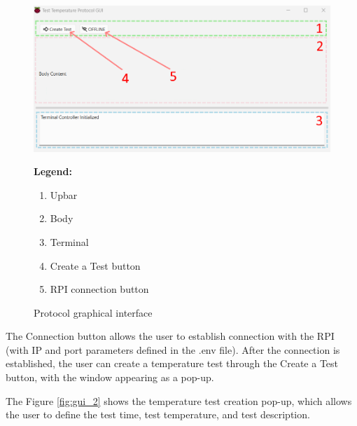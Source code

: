 \begin{figure}[H]
    \centering
    \begin{minipage}{0.6\textwidth}
        \includegraphics[width=\linewidth]{figures/gui_1.png}
    \end{minipage}%
    \hfill
    \begin{minipage}{0.35\textwidth}
        \small
        \textbf{Legend:}
        \begin{enumerate}
            \item Upbar
            \item Body
            \item Terminal
            \item Create a Test button
            \item RPI connection button
        \end{enumerate}
    \end{minipage}
    \caption{Protocol graphical interface}
    \label{fig:gui_1}
\end{figure}

The Connection button allows the user to establish connection with the RPI (with IP and port parameters defined in the .env file). After the connection is established, the user can create a temperature test through the Create a Test button, with the window appearing as a pop-up.

The Figure \ref{fig:gui_2} shows the temperature test creation pop-up, which allows the user to define the test time, test temperature, and test description.

